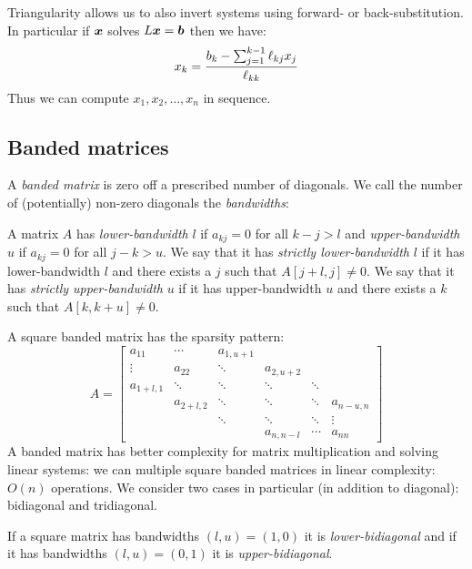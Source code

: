 Triangularity allows us to also invert systems using forward- or back-substitution. In particular if $\bm{{\mbox{\boldmath$x$\unboldmath}}}$ solves $L \bm{{\mbox{\boldmath$x$\unboldmath}}} = \bm{{\mbox{\boldmath$b$\unboldmath}}}$ then we have:
\[
x_k = {b_k - \ensuremath{\sum}_{j=1}^{k-1} \ensuremath{\ell}_{kj} x_j \over \ensuremath{\ell}_{kk}}
\]
Thus we can compute $x_1,x_2,\ensuremath{\ldots},x_n$ in sequence.

\subsection{Banded matrices}
A \emph{banded matrix} is zero off a prescribed number of diagonals. We call the number of (potentially) non-zero diagonals the \emph{bandwidths}:

\begin{definition}[bandwidths] A matrix $A$ has \emph{lower-bandwidth} $l$ if $a_{kj} = 0$ for all $k-j > l$ and \emph{upper-bandwidth} $u$ if $a_{kj} = 0$ for all $j-k > u$. We say that it has \emph{strictly lower-bandwidth} $l$ if it has lower-bandwidth $l$ and there exists a $j$ such that $A[j+l,j] \neq 0$. We say that it has \emph{strictly upper-bandwidth} $u$ if it has upper-bandwidth $u$ and there exists a $k$ such that $A[k,k+u] \neq 0$. \end{definition}

A square banded matrix has the sparsity pattern:
\[
A = \begin{bmatrix}
a_{11} & \ensuremath{\cdots} & a_{1,u+1} \\
\ensuremath{\vdots} & a_{22} & \ensuremath{\ddots} &  a_{2,u+2} \\
a_{1+l,1} & \ensuremath{\ddots} & \ensuremath{\ddots} & \ensuremath{\ddots} & \ensuremath{\ddots} \\
& a_{2+l,2} & \ensuremath{\ddots} & \ensuremath{\ddots} &  \ensuremath{\ddots} & a_{n-u,n} \\
&& \ensuremath{\ddots} & \ensuremath{\ddots} & \ensuremath{\ddots} & \ensuremath{\vdots} \\
&&& a_{n,n-l} & \ensuremath{\cdots} & a_{nn}
\end{bmatrix}
\]
A banded matrix has better complexity for matrix multiplication and solving linear systems:  we can multiple square banded matrices in linear complexity: $O(n)$ operations. We consider two cases in particular (in addition to diagonal): bidiagonal and tridiagonal.

\begin{definition}[Bidiagonal] If a square matrix has bandwidths $(l,u) = (1,0)$ it is \emph{lower-bidiagonal} and if it has bandwidths $(l,u) = (0,1)$ it is \emph{upper-bidiagonal}. \end{definition}

